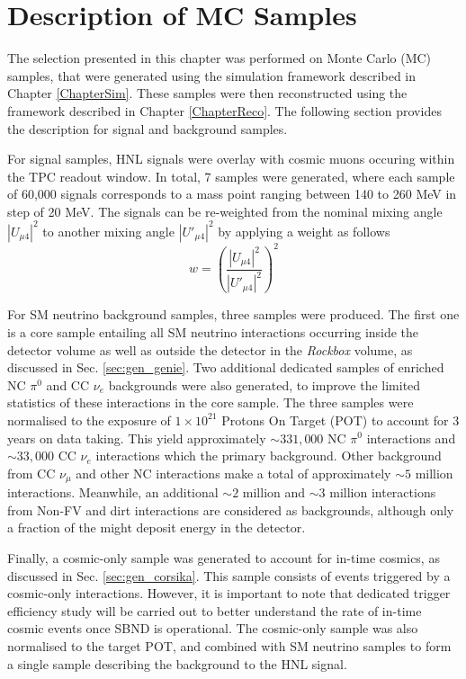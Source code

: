 
\section{Description of MC Samples}

The selection presented in this chapter was performed on Monte Carlo (MC) samples, that were generated using the simulation framework described in Chapter \ref{ChapterSim}.
These samples were then reconstructed using the framework described in Chapter \ref{ChapterReco}.
The following section provides the description for signal and background samples.

For signal samples, HNL signals were overlay with cosmic muons occuring within the TPC readout window. 
In total, 7 samples were generated, where each sample of 60,000 signals corresponds to a mass point ranging between 140 to 260 MeV in step of 20 MeV.
The signals can be re-weighted from the nominal mixing angle $|U_{\mu4}|^{2}$ to another mixing angle $|U'_{\mu4}|^{2}$ by applying a weight as follows
\begin{equation}
    w = \left(\frac{|U_{\mu4}|^{2}}{|U'_{\mu4}|^{2}}\right)^{2}
\end{equation}

For SM neutrino background samples, three samples were produced.
The first one is a core sample entailing all SM neutrino interactions occurring inside the detector volume as well as outside the detector in the \textit{Rockbox} volume, as discussed in Sec. \ref{sec:gen_genie}.
Two additional dedicated samples of enriched NC $\pi^0$ and CC $\nu_e$ backgrounds were also generated, to improve the limited statistics of these interactions in the core sample.
The three samples were normalised to the exposure of $1 \times 10^{21}$ Protons On Target (POT) to account for 3 years on data taking.
This yield approximately $\sim331,000$ NC $\pi^0$ interactions and $\sim33,000$ CC $\nu_e$ interactions which the primary background.
Other background from CC $\nu_\mu$ and other NC interactions make a total of approximately $\sim5$ million interactions.
Meanwhile, an additional $\sim2$ million and $\sim3$ million interactions from Non-FV and dirt interactions are considered as backgrounds, although only a fraction of the might deposit energy in the detector.

Finally, a cosmic-only sample was generated to account for in-time cosmics, as discussed in Sec. \ref{sec:gen_corsika}.
This sample consists of events triggered by a cosmic-only interactions.
However, it is important to note that dedicated trigger efficiency study will be carried out to better understand the rate of in-time cosmic events once SBND is operational.
The cosmic-only sample was also normalised to the target POT, and combined with SM neutrino samples to form a single sample describing the background to the HNL signal.  

